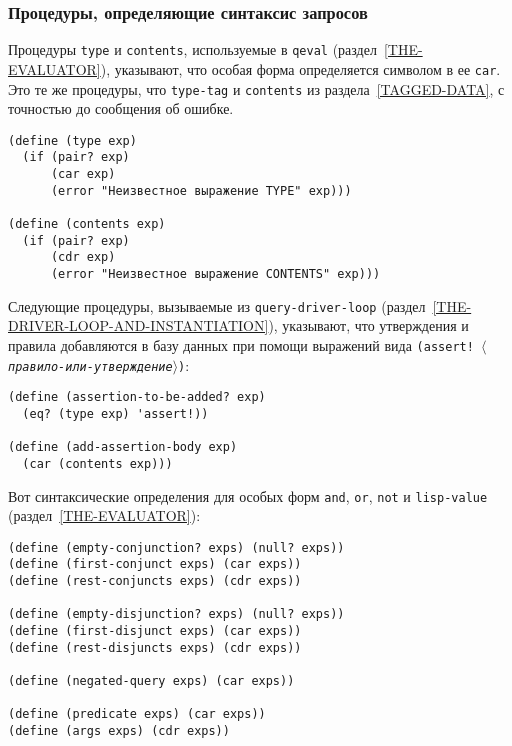 \subsubsection{Процедуры, определяющие синтаксис запросов}
\label{QUERY-SYNTAX-PROCEDURES}%

Процедуры {\tt type} и {\tt contents},
используемые в {\tt qeval}
(раздел~\ref{THE-EVALUATOR}), указывают, что особая форма
определяется символом в ее {\tt car}.  Это те же процедуры, что
{\tt type-tag} и {\tt contents} из 
раздела~\ref{TAGGED-DATA}, с точностью до сообщения об ошибке.

\begin{Verbatim}[fontsize=\small]
(define (type exp)
  (if (pair? exp)
      (car exp)
      (error "Неизвестное выражение TYPE" exp)))

(define (contents exp)
  (if (pair? exp)
      (cdr exp)
      (error "Неизвестное выражение CONTENTS" exp)))
\end{Verbatim}

Следующие процедуры, вызываемые из
{\tt query-driver-loop} 
(раз\-дел~\ref{THE-DRIVER-LOOP-AND-INSTANTIATION}), указывают, что
утверждения и правила добавляются в базу данных при помощи выражений
вида {\tt (assert! \textit{$\langle$правило-или-утверждение$\rangle$})}:
{\sloppy

}

\begin{Verbatim}[fontsize=\small]
(define (assertion-to-be-added? exp)
  (eq? (type exp) 'assert!))

(define (add-assertion-body exp)
  (car (contents exp)))
\end{Verbatim}

Вот синтаксические определения для особых форм
{\tt and}, {\tt or}, {\tt not} и
{\tt lisp-value} (раздел~\ref{THE-EVALUATOR}):

\begin{Verbatim}[fontsize=\small]
(define (empty-conjunction? exps) (null? exps))
(define (first-conjunct exps) (car exps))
(define (rest-conjuncts exps) (cdr exps))

(define (empty-disjunction? exps) (null? exps))
(define (first-disjunct exps) (car exps))
(define (rest-disjuncts exps) (cdr exps))

(define (negated-query exps) (car exps))

(define (predicate exps) (car exps))
(define (args exps) (cdr exps))
\end{Verbatim}

